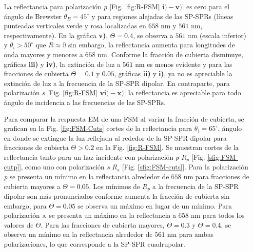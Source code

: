 La reflectancia para polarización \emph{p} [Fig. \ref{fig:R-FSM} $\mathbf{i)-v)}$] es cero para el ángulo de Brewster $\theta_B = 45^\circ$ y para regiones alejadas de las SP-SPRs (líneas punteadas verticales verde y rosa  localizadas en $658$ nm y $561$ nm, respectivamente). En la gráfica \textbf{v)}, $\Theta=0.4$,  se observa a $561$ nm (escala inferior) y $\theta_i>50^\circ$ que $R\approx 0$ sin embargo, la reflectancia aumenta para longitudes de onda mayores y menores a $658$ nm. Conforme la fracción de cubierta disminuye, gráficas \textbf{iii)} y \textbf{iv)}, la extinción de luz a $561$ nm  es menos evidente y para las fracciones de cubierta $\Theta=0.1$ y $0.05$, gráficas \textbf{ii)} y \textbf{i)}, ya no es apreciable la extinción de luz a la frecuencia de la SP-SPR dipolar. En contraparte, para polarización \emph{s} [Fig. \ref{fig:R-FSM} $\mathbf{vi)-x)}$] la reflectancia es apreciable para todo ángulo de incidencia a las frecuencias de las SP-SPRs. 

Para comparar la respuesta EM  de una FSM al variar la fracción de cubierta, se grafican en la  Fig. \ref{fig:FSM-Cuts} cortes de la reflectancia para $\theta_i = 65^\circ$, ángulo en donde se extingue la luz reflejada al rededor de la SP-SPR dipolar para fracciones de cubierta $\Theta>0.2$ en la Fig. \ref{fig:R-FSM}. Se muestran cortes de la reflectancia tanto para un haz incidente con polarización \emph{p} $R_p$ [Fig. \ref{sfig:FSM-cutp}], como uno con polarización \emph{s} $R_s$ [Fig. \ref{sfig:FSM-cuts}]. Para la polarización \emph{p} se presenta un mínimo en la reflectancia alrededor de $658$ nm para fracciones de cubierta mayores a $\Theta = 0.05$. Los mínimos de $R_p$ a la frecuencia de la SP-SPR dipolar son más pronunciados conforme aumenta la fracción de cubierta sin embargo, para $\Theta=0.05$ se observa un máximo en lugar de un mínimo. Para polarización \emph{s}, se presenta un máximo en la reflectancia a $658$ nm para todos los valores de $\Theta$. Para las fracciones de cubierta mayores, $\Theta = 0.3$ y $\Theta = 0.4$,  se observa un  mínimo en la reflectancia alrededor de $561$ nm para ambas polarizaciones, lo que corresponde a la SP-SPR cuadrupolar.

